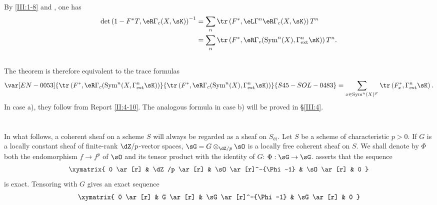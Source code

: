 By \ref{III:1-8} and , one has
\begin{align*}
  \det\left(1-F^* T,\eR\Gamma_c(X,\sK)\right)^{-1}
    &= \sum_n \tr\left(F^*,\eL\Gamma^n\eR\Gamma_c(X,\sK)\right) T^n \\
    &= \sum_n \tr\left(F^*,\eR\Gamma_c(\operatorname{Sym}^n(X),\Gamma_\text{ext}^n\sK)\right) T^n \text{.}
\end{align*}






\subsection{}\label{III:2-13}

The theorem is therefore equivalent to the trace formulas
\[
  \var[EN-0053]{\tr\left(F^*,\eR\Gamma_c(\operatorname{Sym}^n(X,\Gamma_\text{ext}^n \sK)\right)}{\tr\left(F^*,\eR\Gamma_c(\operatorname{Sym}^n(X),\Gamma_\text{ext}^n \sK)\right)}{S45-SOL-0483} = \sum_{x\in\operatorname{Sym}^n(X)^F} \tr\left(F_x^*,\Gamma_\text{ext}^n\sK\right) \text{.}
\]
In case a), they follow from Report \ref{II:4-10}. The analogous formula in
case b) will be proved in \S\ref{III:4}.










\section{}\label{III:3}






\subsection{}\label{III:3-1}

In what follows, a coherent sheaf on a scheme $S$ will always be regarded as
a sheaf on $S_\text{ét}$. Let $S$ be a scheme of characteristic $p>0$. If
$G$ is a locally constant sheaf of finite-rank $\dZ/p$-vector spaces,
$\sG=G\otimes_{\dZ/p}\sO$ is a locally free coherent sheaf on $S$. We shall
denote by $\Phi$ both the endomorphism $f\to f^p$ of $\sO$ and its tensor
product with the identity of $G$: $\Phi:\sG\to\sG$.  asserts that the sequence
\[\xymatrix{
  0 \ar[r]
    & \dZ/p \ar[r]
    & \sO \ar[r]^-{\Phi-1}
    & \sO \ar[r]
    & 0
}\]
is exact. Tensoring with $G$ gives an exact sequence
\[\xymatrix{
  0 \ar[r]
    & G \ar[r]
    & \sG \ar[r]^-{\Phi-1}
    & \sG \ar[r]
    & 0
}\]






